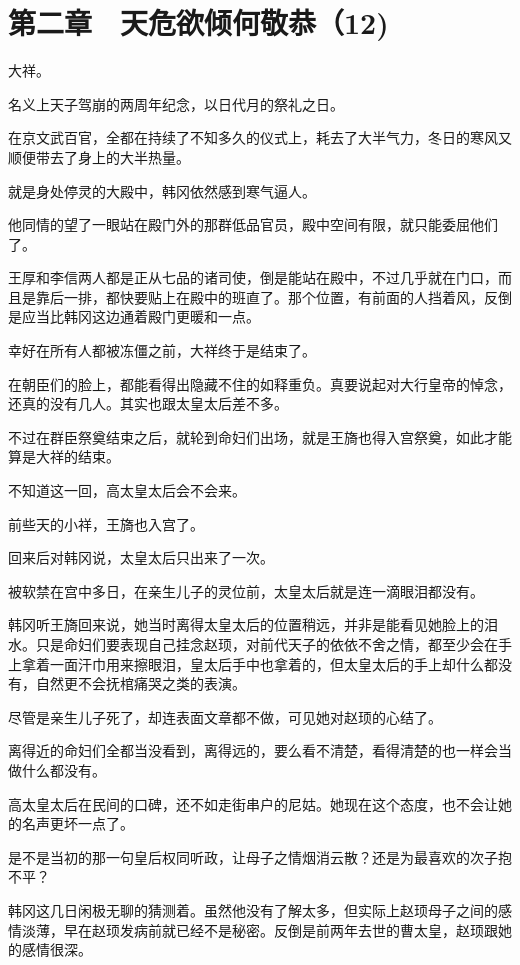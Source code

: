 \section{第二章　天危欲倾何敬恭（12)}

大祥。

名义上天子驾崩的两周年纪念，以日代月的祭礼之日。

在京文武百官，全都在持续了不知多久的仪式上，耗去了大半气力，冬日的寒风又顺便带去了身上的大半热量。

就是身处停灵的大殿中，韩冈依然感到寒气逼人。

他同情的望了一眼站在殿门外的那群低品官员，殿中空间有限，就只能委屈他们了。

王厚和李信两人都是正从七品的诸司使，倒是能站在殿中，不过几乎就在门口，而且是靠后一排，都快要贴上在殿中的班直了。那个位置，有前面的人挡着风，反倒是应当比韩冈这边通着殿门更暖和一点。

幸好在所有人都被冻僵之前，大祥终于是结束了。

在朝臣们的脸上，都能看得出隐藏不住的如释重负。真要说起对大行皇帝的悼念，还真的没有几人。其实也跟太皇太后差不多。

不过在群臣祭奠结束之后，就轮到命妇们出场，就是王旖也得入宫祭奠，如此才能算是大祥的结束。

不知道这一回，高太皇太后会不会来。

前些天的小祥，王旖也入宫了。

回来后对韩冈说，太皇太后只出来了一次。

被软禁在宫中多日，在亲生儿子的灵位前，太皇太后就是连一滴眼泪都没有。

韩冈听王旖回来说，她当时离得太皇太后的位置稍远，并非是能看见她脸上的泪水。只是命妇们要表现自己挂念赵顼，对前代天子的依依不舍之情，都至少会在手上拿着一面汗巾用来擦眼泪，皇太后手中也拿着的，但太皇太后的手上却什么都没有，自然更不会抚棺痛哭之类的表演。

尽管是亲生儿子死了，却连表面文章都不做，可见她对赵顼的心结了。

离得近的命妇们全都当没看到，离得远的，要么看不清楚，看得清楚的也一样会当做什么都没有。

高太皇太后在民间的口碑，还不如走街串户的尼姑。她现在这个态度，也不会让她的名声更坏一点了。

是不是当初的那一句皇后权同听政，让母子之情烟消云散？还是为最喜欢的次子抱不平？

韩冈这几日闲极无聊的猜测着。虽然他没有了解太多，但实际上赵顼母子之间的感情淡薄，早在赵顼发病前就已经不是秘密。反倒是前两年去世的曹太皇，赵顼跟她的感情很深。

